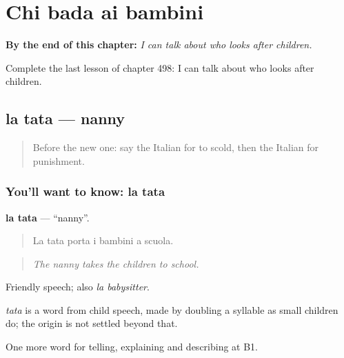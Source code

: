 
\chapter{Chi bada ai bambini}
\label{ch:it-chi-bada-ai-bambini}

\begin{chapteropening}
\textbf{By the end of this chapter:} \emph{I can talk about who looks after children.}

Complete the last lesson of chapter 498: I can talk about who looks after children.
\end{chapteropening}

\section[la tata]{la tata — nanny}

\label{lesson:IT-C498-tata}



\begin{quote}
Before the new one: say the Italian for to scold, then the Italian for punishment.
\end{quote}

\subsection*{You'll want to know: la tata}
\textbf{la tata} — \textquotedblleft{}nanny\textquotedblright{}.

\begin{quote}
La tata porta i bambini a scuola.
\end{quote}

\begin{quote}
\emph{The nanny takes the children to school.}
\end{quote}

Friendly speech; also \emph{la babysitter}.

\begin{cousinweb}
\emph{tata} is a word from child speech, made by doubling a syllable as small children do; the origin is not settled beyond that.
\end{cousinweb}

\begin{grammarlens}[title={What you've built}]
One more word for telling, explaining and describing at B1.
\end{grammarlens}

